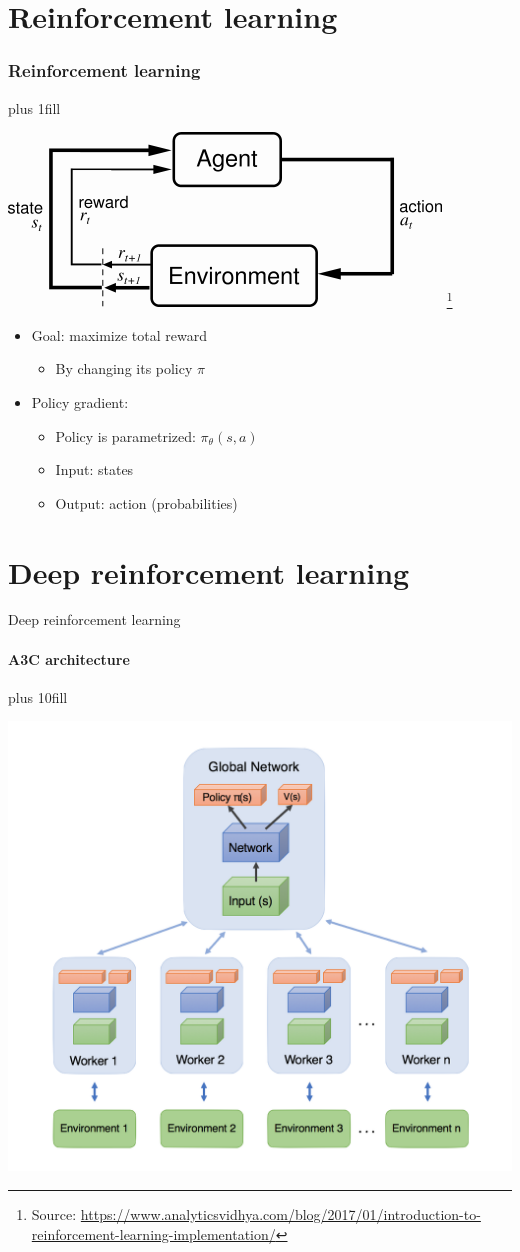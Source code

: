 \documentclass{beamer}
\begin{document}
\section{Reinforcement learning}
\begin{frame}[fragile]\frametitle{Reinforcement learning}
\vskip0pt plus 1fill
\begin{center}
    \includegraphics[width=.7\linewidth]{reinforcementlearning.png}
    \footnote{Source: \url{https://www.analyticsvidhya.com/blog/2017/01/introduction-to-reinforcement-learning-implementation/}}
\end{center}
\begin{itemize}
    \item Goal: maximize total reward
    \begin{itemize}
        \item By changing its policy $\pi$
    \end{itemize}
    \item Policy gradient:
    \begin{itemize}
        \item Policy is parametrized: $\pi_\theta(s,a)$
        \item Input: states
        \item Output: action (probabilities)
    \end{itemize}
\end{itemize}
\end{frame}

\section{Deep reinforcement learning}
\begin{frame}[fragile]{Deep reinforcement learning}
\framesubtitle{A3C architecture}
\vskip0pt plus 10fill
\begin{center}
    \includegraphics[width=.7\linewidth]{A3Carchitecture}
\end{center}
\end{frame}
\end{document}
